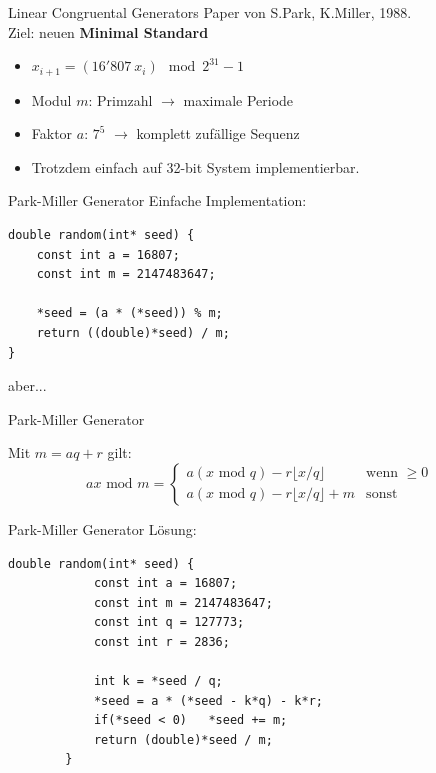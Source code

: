 \documentclass{beamer}
\begin{document}
\begin{frame}{Linear Congruental Generators}
	Paper von S.Park, K.Miller, 1988. \\ Ziel: neuen \textbf{Minimal Standard}
	
	\begin{itemize}
		\item<2-> $x_{i+1} = \left( 16'807 \: x_i \right) \mod{2^{31}-1}$ 
		\item<3-> Modul $m$: Primzahl $\rightarrow$ maximale Periode
		\item<4-> Faktor $a$: $7^5$ $\rightarrow$ komplett zufällige Sequenz
		\item<5-> Trotzdem einfach auf 32-bit System implementierbar.
	\end{itemize}
\end{frame}
\begin{frame}[fragile]{Park-Miller Generator}
	Einfache Implementation: \vspace{0.5cm}
	\begin{lstlisting}[style=C]
double random(int* seed) {
    const int a = 16807;
    const int m = 2147483647;
	
    *seed = (a * (*seed)) % m;
    return ((double)*seed) / m;
}
	\end{lstlisting}
	\vspace{0.5cm}
	aber...
\end{frame}
\begin{frame}{Park-Miller Generator}

	Mit $m = aq + r$ gilt:
	\begin{equation*}
		a x \text{ mod } m = 
			\begin{cases}
				a \left(x \text{ mod } q\right) - r \lfloor x / q\rfloor & \text{wenn }\geq 0 \\
				a \left(x \text{ mod } q\right) - r \lfloor x / q\rfloor + m & \text{sonst}
			\end{cases}
	\end{equation*}
\end{frame}
\begin{frame}[fragile]{Park-Miller Generator}
	Lösung: \vspace{0.5cm}
	\begin{lstlisting}[style=C]
		double random(int* seed) {
		    const int a = 16807;
		    const int m = 2147483647;
		    const int q = 127773;
		    const int r = 2836;
			
		    int k = *seed / q;
		    *seed = a * (*seed - k*q) - k*r;
		    if(*seed < 0)   *seed += m;
		    return (double)*seed / m;
		}
	\end{lstlisting}
\end{frame}
\end{document}
